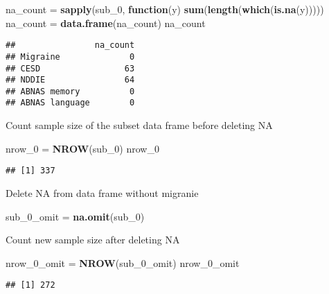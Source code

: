 \documentclass[]{article}
\newenvironment{Shaded}{\begin{snugshade}}{\end{snugshade}}
\newcommand{\KeywordTok}[1]{\textcolor[rgb]{0.13,0.29,0.53}{\textbf{#1}}}
\newcommand{\DecValTok}[1]{\textcolor[rgb]{0.00,0.00,0.81}{#1}}
\newcommand{\StringTok}[1]{\textcolor[rgb]{0.31,0.60,0.02}{#1}}
\newcommand{\ControlFlowTok}[1]{\textcolor[rgb]{0.13,0.29,0.53}{\textbf{#1}}}
\newcommand{\NormalTok}[1]{#1}
\begin{document}
\begin{Shaded}
\begin{Highlighting}[]
\NormalTok{na_count =}\StringTok{ }\KeywordTok{sapply}\NormalTok{(sub_}\DecValTok{0}\NormalTok{, }\ControlFlowTok{function}\NormalTok{(y) }\KeywordTok{sum}\NormalTok{(}\KeywordTok{length}\NormalTok{(}\KeywordTok{which}\NormalTok{(}\KeywordTok{is.na}\NormalTok{(y)))))}
\NormalTok{na_count =}\StringTok{ }\KeywordTok{data.frame}\NormalTok{(na_count)}
\NormalTok{na_count}
\end{Highlighting}
\end{Shaded}

\begin{verbatim}
##                na_count
## Migraine              0
## CESD                 63
## NDDIE                64
## ABNAS memory          0
## ABNAS language        0
\end{verbatim}

Count sample size of the subset data frame before deleting NA

\begin{Shaded}
\begin{Highlighting}[]
\NormalTok{nrow_}\DecValTok{0}\NormalTok{ =}\StringTok{ }\KeywordTok{NROW}\NormalTok{(sub_}\DecValTok{0}\NormalTok{)}
\NormalTok{nrow_}\DecValTok{0}
\end{Highlighting}
\end{Shaded}

\begin{verbatim}
## [1] 337
\end{verbatim}

Delete NA from data frame without migranie

\begin{Shaded}
\begin{Highlighting}[]
\NormalTok{sub_0_omit =}\StringTok{ }\KeywordTok{na.omit}\NormalTok{(sub_}\DecValTok{0}\NormalTok{)}
\end{Highlighting}
\end{Shaded}

Count new sample size after deleting NA

\begin{Shaded}
\begin{Highlighting}[]
\NormalTok{nrow_0_omit =}\StringTok{ }\KeywordTok{NROW}\NormalTok{(sub_0_omit)}
\NormalTok{nrow_0_omit}
\end{Highlighting}
\end{Shaded}

\begin{verbatim}
## [1] 272
\end{verbatim}
\end{document}
